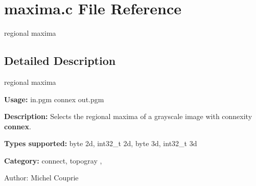 \section{maxima.c File Reference}
\label{maxima_8c}
regional maxima 



\subsection{Detailed Description}
regional maxima 

{\bf Usage:} in.pgm connex out.pgm

{\bf Description:} Selects the regional maxima of a grayscale image with connexity {\bf connex}.

{\bf Types supported:} byte 2d, int32\_\-t 2d, byte 3d, int32\_\-t 3d

{\bf Category:} connect, topogray ,

\begin{Desc}
\item[Author:]Michel Couprie \end{Desc}
